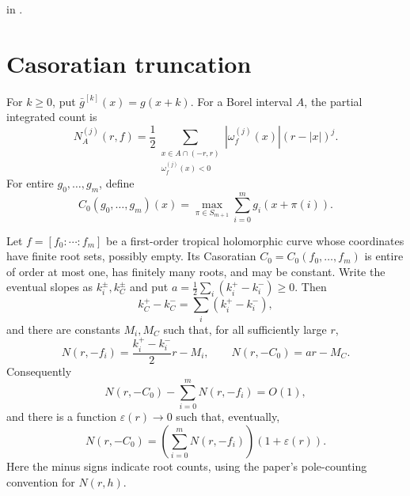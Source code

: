 \begin{leanproof}
 in
.
\end{leanproof}

\section{Casoratian truncation}

\begin{definition}
\leanok
{}
For $k\geq0$, put $\bar g^{[k]}(x)=g(x+k)$.  For a Borel interval $A$, the
partial integrated count is
\[
 N_A^{(j)}(r,f)=\frac12
 \sum_{\substack{x\in A\cap(-r,r)\\ \omega_f^{(j)}(x)<0}}
 |\omega_f^{(j)}(x)|(r-|x|)^j.
\]
For entire $g_0,\ldots,g_m$, define
\[
 C_0(g_0,\ldots,g_m)(x)=
 \max_{\pi\in S_{m+1}}\sum_{i=0}^m g_i(x+\pi(i)).
\]
\end{definition}

\begin{theorem}
\leanok
{}
Let $f=[f_0:\cdots:f_m]$ be a first-order tropical holomorphic curve whose
coordinates have finite root sets, possibly empty.  Its Casoratian
$C_0=C_0(f_0,\ldots,f_m)$ is entire of order at most one, has finitely many
roots, and may be constant.  Write the eventual slopes as $k_i^\pm,k_C^\pm$
and put $a=\frac12\sum_i(k_i^+-k_i^-)\geq0$.  Then
\[
 k_C^+-k_C^-=\sum_i(k_i^+-k_i^-),
\]
and there are constants $M_i,M_C$ such that, for all sufficiently large $r$,
\[
 N(r,-f_i)=\frac{k_i^+-k_i^-}{2}r-M_i,\qquad
 N(r,-C_0)=ar-M_C.
\]
Consequently
\[
 N(r,-C_0)-\sum_{i=0}^mN(r,-f_i)=O(1),
\]
and there is a function $\varepsilon(r)\to0$ such that, eventually,
\[
 N(r,-C_0)=\left(\sum_{i=0}^mN(r,-f_i)\right)(1+\varepsilon(r)).
\]
Here the minus signs indicate root counts, using the paper's pole-counting
convention for $N(r,h)$.
\end{theorem}

